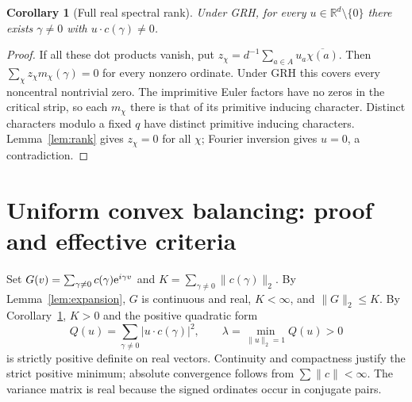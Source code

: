 \documentclass[11pt]{article}
\newtheorem{corollary}[theorem]{Corollary}
\theoremstyle{remark}\newtheorem{remark}[theorem]{Remark}
\newcommand{\R}{\mathbb R}\newcommand{\C}{\mathbb C}\newcommand{\Z}{\mathbb Z}
\begin{document}
\begin{corollary}[Full real spectral rank]\label{cor:rank}
Under GRH, for every $u\in\R^d\setminus\{0\}$ there exists $\gamma\ne0$ with $u\cdot c(\gamma)\ne0$.
\end{corollary}
\begin{proof}
If all these dot products vanish, put $z_\chi=d^{-1}\sum_{a\in A}u_a\overline{\chi(a)}$. Then $\sum_\chi z_\chi m_\chi(\gamma)=0$ for every nonzero ordinate. Under GRH this covers every noncentral nontrivial zero. The imprimitive Euler factors have no zeros in the critical strip, so each $m_\chi$ there is that of its primitive inducing character. Distinct characters modulo a fixed $q$ have distinct primitive inducing characters. Lemma~\ref{lem:rank} gives $z_\chi=0$ for all $\chi$; Fourier inversion gives $u=0$, a contradiction.
\end{proof}

\section{Uniform convex balancing: proof and effective criteria}
Set $G(v)=\sum_{\gamma\ne0}c(\gamma)\mathrm e^{i\gamma v}$ and $K=\sum_{\gamma\ne0}\|c(\gamma)\|_2$. By Lemma~\ref{lem:expansion}, $G$ is continuous and real, $K<\infty$, and $\|G\|_2\le K$. By Corollary~\ref{cor:rank}, $K>0$ and the positive quadratic form
\[
 Q(u)=\sum_{\gamma\ne0}|u\cdot c(\gamma)|^2,
 \qquad \lambda=\min_{\|u\|_2=1} Q(u)>0
\]
is strictly positive definite on real vectors. Continuity and compactness justify the strict positive minimum; absolute convergence follows from $\sum\|c\|<\infty$. The variance matrix is real because the signed ordinates occur in conjugate pairs.
\end{document}
